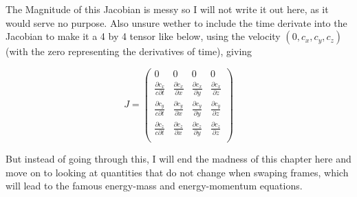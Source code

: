 


The Magnitude of this Jacobian is messy so I will not write it out here, as it would serve no purpose.
Also unsure wether to include the time derivate into the Jacobian to make it a 4 by 4 tensor like below, using the velocity $( 0 , c_x , c_y , c_z )$ (with the zero representing the derivatives of time), giving

\begin{equation}
	J =
	\begin{pmatrix}
		0                                 & 0                               & 0                               & 0                               \\
		\frac{\partial c_x}{c \partial t} & \frac{\partial c_x}{\partial x} & \frac{\partial c_x}{\partial y} & \frac{\partial c_x}{\partial z} \\
		\frac{\partial c_y}{c \partial t} & \frac{\partial c_y}{\partial x} & \frac{\partial c_y}{\partial y} & \frac{\partial c_y}{\partial z} \\
		\frac{\partial c_z}{c \partial t} & \frac{\partial c_z}{\partial x} & \frac{\partial c_z}{\partial y} & \frac{\partial c_z}{\partial z} \\
	\end{pmatrix}
\end{equation}

But instead of going through this, I will end the madness of this chapter here and move on to looking at quantities that do not change when swaping frames, which will lead to the famous energy-mass and energy-momentum equations.


